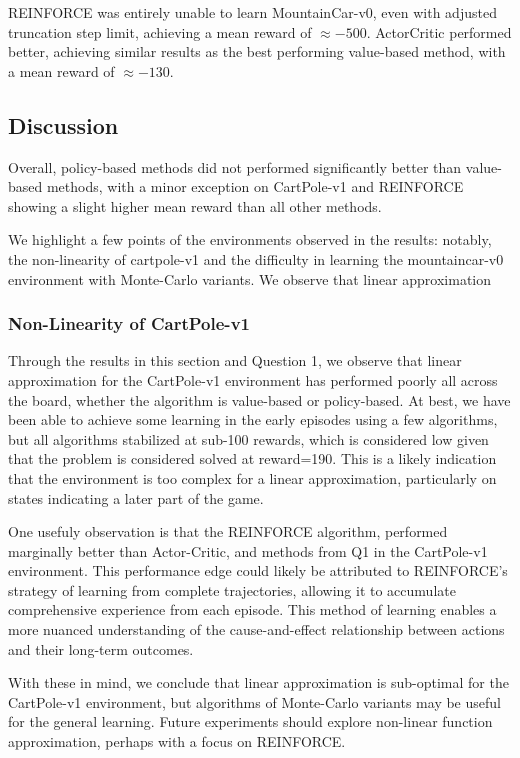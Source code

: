 \documentclass{article}
\begin{document}
REINFORCE was entirely unable to learn MountainCar-v0, even with adjusted truncation step limit,
achieving a mean reward of $\approx -500$. ActorCritic performed better, achieving similar
results as the best performing value-based method, with a mean reward of $\approx -130$.

\subsection{Discussion}
Overall, policy-based methods did not performed significantly better than value-based methods,
with a minor exception on CartPole-v1 and REINFORCE showing a slight higher mean reward than
all other methods.

We highlight a few points of the environments observed in the results: notably, the non-linearity of
cartpole-v1 and the difficulty in learning the mountaincar-v0 environment with Monte-Carlo variants.
We observe that linear approximation

\subsubsection{Non-Linearity of CartPole-v1}

Through the results in this section and Question 1, we observe that linear approximation
for the CartPole-v1 environment has performed poorly all across the board, whether the algorithm
is value-based or policy-based. At best, we have been
able to achieve some learning in the early episodes using a few algorithms, but all algorithms
stabilized at sub-100 rewards, which is considered low given that the problem is considered solved at reward=190\cite{gym}.
This is a likely indication that the environment is too complex for a linear
approximation, particularly on states indicating a later part of the game.

One usefuly observation is that the REINFORCE algorithm, performed marginally better
than Actor-Critic, and methods from Q1 in the CartPole-v1 environment.
This performance edge could likely be attributed to REINFORCE's strategy of learning from complete trajectories,
allowing it to accumulate comprehensive experience from each episode.
This method of learning enables a more nuanced understanding of the cause-and-effect
relationship between actions and their long-term outcomes.

With these in mind, we conclude that linear approximation is sub-optimal
for the CartPole-v1 environment, but algorithms of Monte-Carlo variants may be useful for the general learning.
Future experiments should explore non-linear function approximation, perhaps with a focus on REINFORCE.
\end{document}
